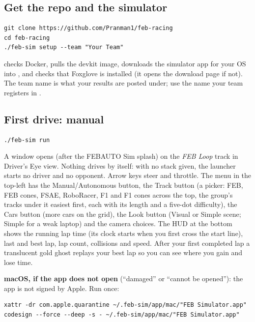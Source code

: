 \documentclass[11pt,a4paper]{article}
\begin{document}
\subsection{Get the repo and the simulator}

\begin{lstlisting}
git clone https://github.com/Pranman1/feb-racing
cd feb-racing
./feb-sim setup --team "Your Team"
\end{lstlisting}

 checks Docker, pulls the devkit image, downloads the simulator app for your
OS into , and checks that Foxglove is installed (it opens the
download page if not). The team name is what your results are posted under;
use the name your team registers in .

\subsection{First drive: manual}

\begin{lstlisting}
./feb-sim run
\end{lstlisting}

A window opens (after the FEBAUTO Sim splash) on the \emph{FEB Loop} track in Driver's Eye view. Nothing drives by itself:
with no stack given, the launcher starts no driver and no opponent. Arrow keys steer and
throttle. The menu in the top-left has the Manual/Autonomous button, the Track button (a
picker: FEB, FEB cones, FSAE, RoboRacer, F1 and F1 cones across the top, the group's tracks
under it easiest first, each with its length and a five-dot difficulty), the Cars button
(more cars on the grid), the Look button (Visual or Simple scene; Simple for a weak laptop)
and the camera choices. The HUD at the bottom shows
the running lap time (its clock starts when you first cross the start line), last and best
lap, lap count, collisions and speed. After your first
completed lap a translucent gold ghost replays your best lap so you can see where you gain
and lose time.

\medskip
\textbf{macOS, if the app does not open} (``damaged'' or ``cannot be opened''): the app is not
signed by Apple. Run once:
\begin{lstlisting}
xattr -dr com.apple.quarantine ~/.feb-sim/app/mac/"FEB Simulator.app"
codesign --force --deep -s - ~/.feb-sim/app/mac/"FEB Simulator.app"
\end{lstlisting}
\end{document}
